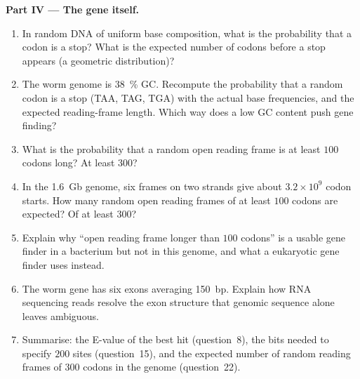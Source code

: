 \begin{problem}
\medskip
\noindent\textbf{Part IV --- The gene itself.}
\begin{enumerate}[resume]
  \item In random DNA of uniform base composition, what is the
        probability that a codon is a stop? What is the expected
        number of codons before a stop appears (a geometric
        distribution)?
  \item The worm genome is \qty{38}{\%} GC. Recompute the probability
        that a random codon is a stop (TAA, TAG, TGA) with the actual
        base frequencies, and the expected reading-frame length. Which
        way does a low GC content push gene finding?
  \item What is the probability that a random open reading frame is at
        least $100$ codons long? At least $300$?
  \item In the \qty{1.6}{Gb} genome, six frames on two strands give
        about $3.2\times 10^{9}$ codon starts. How many random open
        reading frames of at least $100$ codons are expected? Of at
        least $300$?
  \item Explain why ``open reading frame longer than $100$ codons'' is
        a usable gene finder in a bacterium but not in this genome,
        and what a eukaryotic gene finder uses instead.
  \item The worm gene has six exons averaging \qty{150}{bp}. Explain
        how RNA sequencing reads resolve the exon structure that
        genomic sequence alone leaves ambiguous.
  \item Summarise: the E-value of the best hit (question~8), the bits
        needed to specify $200$ sites (question~15), and the expected
        number of random reading frames of $300$ codons in the genome
        (question~22).
\end{enumerate}
\end{problem}
